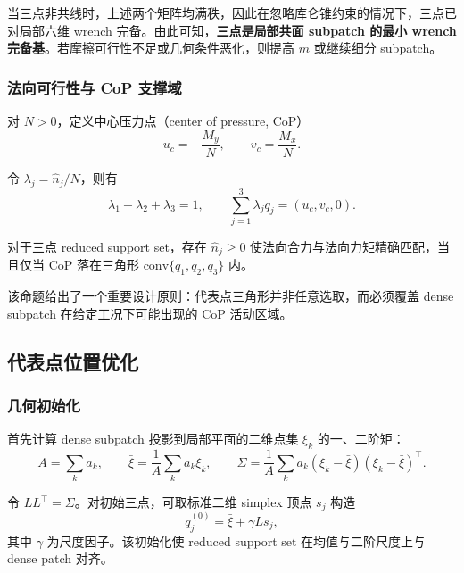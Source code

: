 当三点非共线时，上述两个矩阵均满秩，因此在忽略库仑锥约束的情况下，三点已对局部六维 wrench 完备。由此可知，\textbf{三点是局部共面 subpatch 的最小 wrench 完备基}。若摩擦可行性不足或几何条件恶化，则提高 $m$ 或继续细分 subpatch。

\subsubsection{法向可行性与 CoP 支撑域}

对 $N>0$，定义中心压力点（center of pressure, CoP）
\begin{equation}
 u_c = -\frac{M_y}{N},
 \qquad
 v_c = \frac{M_x}{N}.
\end{equation}

令 $\lambda_j = \hat{n}_j/N$，则有
\begin{equation}
\lambda_1+\lambda_2+\lambda_3=1,
\qquad
\sum_{j=1}^{3}\lambda_j q_j = (u_c,v_c,0).
\end{equation}

\begin{proposition}
对于三点 reduced support set，存在 $\hat{n}_j\ge 0$ 使法向合力与法向力矩精确匹配，当且仅当 CoP 落在三角形 $\mathrm{conv}\{q_1,q_2,q_3\}$ 内。
\end{proposition}

该命题给出了一个重要设计原则：代表点三角形并非任意选取，而必须覆盖 dense subpatch 在给定工况下可能出现的 CoP 活动区域。

\subsection{代表点位置优化}

\subsubsection{几何初始化}

首先计算 dense subpatch 投影到局部平面的二维点集 $\xi_k$ 的一、二阶矩：
\begin{equation}
A = \sum_k a_k,
\qquad
\bar{\xi} = \frac{1}{A}\sum_k a_k \xi_k,
\qquad
\Sigma = \frac{1}{A}\sum_k a_k(\xi_k-\bar{\xi})(\xi_k-\bar{\xi})^\top.
\end{equation}

令 $LL^\top=\Sigma$。对初始三点，可取标准二维 simplex 顶点 $s_j$ 构造
\begin{equation}
 q_j^{(0)} = \bar{\xi} + \gamma L s_j,
\end{equation}
其中 $\gamma$ 为尺度因子。该初始化使 reduced support set 在均值与二阶尺度上与 dense patch 对齐。

